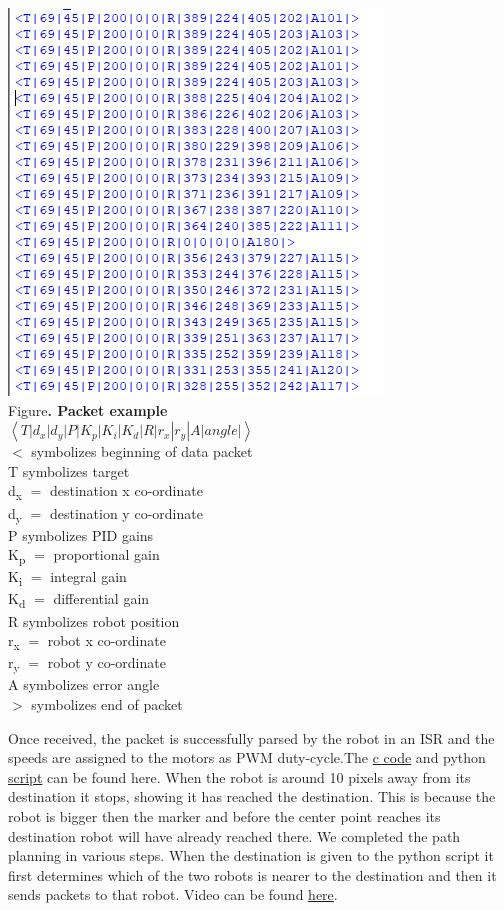 \documentclass[a4paper,12pt,oneside]{book}
\begin{document}
\begin{center}
\includegraphics[scale=0.5]{capture.png}\\
\small{Figure\textbf{. Packet example}}\\
$\left\langle T|d_x|d_y|P|K_p|K_i|K_d|R|r_x|r_y|A|angle |\right\rangle$\\
$<$ symbolizes beginning of data packet\\
T symbolizes target\\
d\textsubscript{x} $=$ destination x co-ordinate\\
d\textsubscript{y} $=$ destination y co-ordinate\\
P symbolizes PID gains\\
K\textsubscript{p} $=$ proportional gain\\
K\textsubscript{i} $=$ integral gain\\
K\textsubscript{d} $=$ differential gain\\
R symbolizes robot position\\
r\textsubscript{x} $=$ robot x co-ordinate\\
r\textsubscript{y} $=$ robot y co-ordinate\\
A symbolizes error angle\\
$>$ symbolizes end of packet\end{center}
Once received, the packet is successfully parsed by the robot in an ISR and the speeds are assigned to the motors as PWM duty-cycle.The \href{https://github.com/eYSIP-2018/Jigsaw_Puzzle_Solver_using_Multiple_Robots/blob/master/Firebird V/firebird.c}{c code} and python \href{https://github.com/eYSIP-2018/Jigsaw_Puzzle_Solver_using_Multiple_Robots/tree/master/Scripts/PID control}{script} can be found here. When the robot is around 10 pixels away from its destination it stops, showing it has reached the destination. This is because the robot is bigger then the marker and before the center point reaches its destination robot will have already reached there.
We completed the path planning in various steps. When the destination is given to the python script it first determines which of the two robots is nearer to the destination and then it sends packets to that robot. Video can be found \href{https://youtu.be/o74QrQ3lfsw}{here}.
\end{document}
